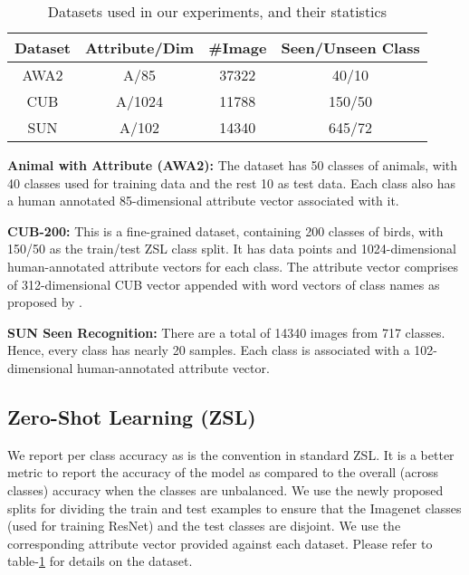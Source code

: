 \documentclass[10pt,twocolumn,letterpaper]{article}
\begin{document}
\begin{table}[H]
\small
\centering
 \addtolength{\tabcolsep}{1.0pt}
 \begin{tabular}{||c|c|c|c||} 
 \hline
 Dataset & Attribute/Dim & \#Image & Seen/Unseen Class \\ [0.5ex] 
 \hline\hline
AWA2 & A/85 & 37322 & 40/10 \\
CUB & A/1024 & 11788 & 150/50 \\
SUN & A/102 & 14340 & 645/72 \\
 \hline
 \hline
 \end{tabular}
 \caption{Datasets used in our experiments, and their statistics} \label{tab:data}
 \vspace{-2em}
\end{table}
\textbf{Animal with Attribute (AWA2):} The dataset has 50 classes of animals, with 40 classes used for training data and the rest 10 as test data. Each class also has a human annotated 85-dimensional attribute vector associated with it.

\textbf{CUB-200:} This is a fine-grained dataset, containing 200 classes of birds, with 150/50 as the train/test ZSL class split. It has  data points and 1024-dimensional human-annotated attribute vectors for each class. The attribute vector comprises of 312-dimensional CUB vector appended with word vectors of class names as proposed by \cite{xian2018zero}.


\textbf{SUN Seen Recognition:} There are a total of 14340 images from 717 classes. Hence, every class has nearly 20 samples. Each class is associated with a 102-dimensional human-annotated attribute vector.









\subsection{Zero-Shot Learning (ZSL)}





We report per class accuracy as is the convention in standard ZSL. It is a better metric to report the accuracy of the model as compared to the overall (across classes) accuracy when the classes are unbalanced. We use the newly proposed splits \cite{xian2018zero} for dividing the train and test examples to ensure that the Imagenet classes (used for training ResNet) and the test classes are disjoint. We use the corresponding attribute vector provided against each dataset. Please refer to table-\ref{tab:data} for details on the dataset.
\end{document}
